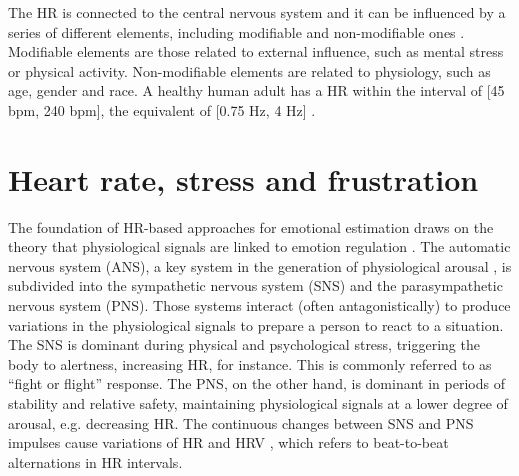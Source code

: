The HR is connected to the central nervous system and it can be influenced by a series of different elements, including modifiable and non-modifiable ones \parencite{valentini2009variables}. Modifiable elements are those related to external influence, such as mental stress or physical activity. Non-modifiable elements are related to physiology, such as age, gender and race. A healthy human adult has a HR within the interval of [45 bpm, 240 bpm], the equivalent of [0.75 Hz, 4 Hz] \parencite{li2014remote}.


%
%
%

\section{Heart rate, stress and frustration}

The foundation of HR-based approaches for emotional estimation draws on the theory that physiological signals are linked to emotion regulation \parencite{appelhans2006heart,fenton2012emotion,schubert2009effects}. The automatic nervous system (ANS), a key system in the generation of physiological arousal \parencite{appelhans2006heart}, is subdivided into the sympathetic nervous system (SNS) and the parasympathetic nervous system (PNS). Those systems interact (often antagonistically) to produce variations in the physiological signals to prepare a person to react to a situation. The SNS is dominant during physical and psychological stress, triggering the body to alertness, increasing HR, for instance. This is commonly referred to as ``fight or flight'' response. The PNS, on the other hand, is dominant in periods of stability and relative safety, maintaining physiological signals at a lower degree of arousal, e.g. decreasing HR. The continuous changes between SNS and PNS impulses cause variations of HR and HRV \parencite{schubert2009effects}, which refers to beat-to-beat alternations in HR intervals.

